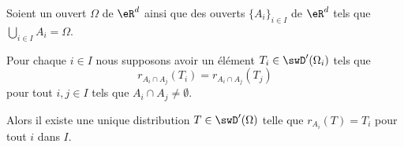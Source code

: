 \begin{proposition}
    Soient un ouvert \( \Omega\) de \( \eR^d\) ainsi que des ouverts \( \{ A_i \}_{i\in I}\) de \( \eR^d\) tels que \( \bigcup_{i\in I}A_i=\Omega\).

    Pour chaque \( i\in I\) nous supposons avoir un élément \( T_i\in\swD'(\Omega_i)\) tels que
    \begin{equation}
        r_{A_i\cap A_j}(T_i)=r_{A_i\cap A_j}(T_j)
    \end{equation}
    pour tout \( i,j\in I\) tels que \( A_i\cap A_j\neq \emptyset\).

    Alors il existe une unique distribution \( T\in \swD'(\Omega)\) telle que \( r_{A_i}(T)=T_i\) pour tout \( i\) dans \( I\).
\end{proposition}

